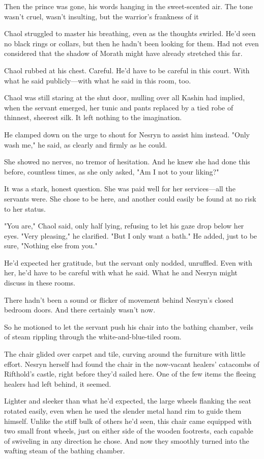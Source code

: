 Then the prince was gone, his words hanging in the sweet-scented air. The tone wasn't cruel, wasn't insulting, but the warrior's frankness of it 

Chaol struggled to master his breathing, even as the thoughts swirled. He'd seen no black rings or collars, but then he hadn't been looking for them. Had not even considered that the shadow of Morath might have already stretched this far.

Chaol rubbed at his chest. Careful. He'd have to be careful in this court. With what he said publicly---with what he said in this room, too.

Chaol was still staring at the shut door, mulling over all Kashin had implied, when the servant emerged, her tunic and pants replaced by a tied robe of thinnest, sheerest silk. It left nothing to the imagination.

He clamped down on the urge to shout for Nesryn to assist him instead. "Only wash me," he said, as clearly and firmly as he could.

She showed no nerves, no tremor of hesitation. And he knew she had done this before, countless times, as she only asked, "Am I not to your liking?"

It was a stark, honest question. She was paid well for her services---all the servants were. She chose to be here, and another could easily be found at no risk to her status.

"You are," Chaol said, only half lying, refusing to let his gaze drop below her eyes. "Very pleasing," he clarified. "But I only want a bath." He added, just to be sure, "Nothing else from you."

He'd expected her gratitude, but the servant only nodded, unruffled. Even with her, he'd have to be careful with what he said. What he and Nesryn might discuss in these rooms.

There hadn't been a sound or flicker of movement behind Nesryn's closed bedroom doors. And there certainly wasn't now.

So he motioned to let the servant push his chair into the bathing chamber, veils of steam rippling through the white-and-blue-tiled room.

The chair glided over carpet and tile, curving around the furniture with little effort. Nesryn herself had found the chair in the now-vacant healers' catacombs of Rifthold's castle, right before they'd sailed here. One of the few items the fleeing healers had left behind, it seemed.

Lighter and sleeker than what he'd expected, the large wheels flanking the seat rotated easily, even when he used the slender metal hand rim to guide them himself. Unlike the stiff bulk of others he'd seen, this chair came equipped with two small front wheels, just on either side of the wooden footrests, each capable of swiveling in any direction he chose. And now they smoothly turned into the wafting steam of the bathing chamber.

